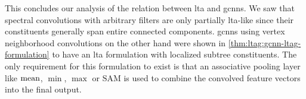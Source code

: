 This concludes our analysis of the relation between \ac{lta} and \acp{gcnn}.
We saw that spectral convolutions with arbitrary filters are only partially \acs{lta}-like since their constituents generally span entire connected components.
\Acp{gcnn} using vertex neighborhood convolutions on the other hand were shown in \cref{thm:ltag:gcnn-ltag-formulation} to have an \ac{lta} formulation with localized subtree constituents.
The only requirement for this formulation to exist is that an associative pooling layer like $\operatorname{mean}$, $\min$, $\max$ or $\mathrm{SAM}$ is used to combine the convolved feature vectors into the final output.
